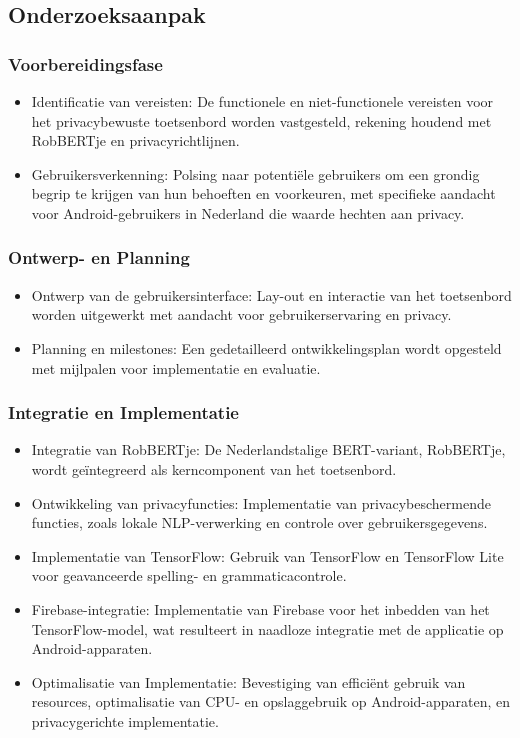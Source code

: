 \subsection{Onderzoeksaanpak}

\subsubsection{Voorbereidingsfase}
\begin{itemize}
    \item Identificatie van vereisten: De functionele en niet-functionele vereisten voor het privacybewuste toetsenbord worden vastgesteld, rekening houdend met RobBERTje en privacyrichtlijnen.
    \item Gebruikersverkenning: Polsing naar potentiële gebruikers om een grondig begrip te krijgen van hun behoeften en voorkeuren, met specifieke aandacht voor Android-gebruikers in Nederland die waarde hechten aan privacy.
\end{itemize}

\subsubsection{Ontwerp- en Planning}
\begin{itemize}
    \item Ontwerp van de gebruikersinterface: Lay-out en interactie van het toetsenbord worden uitgewerkt met aandacht voor gebruikerservaring en privacy.
    \item Planning en milestones: Een gedetailleerd ontwikkelingsplan wordt opgesteld met mijlpalen voor implementatie en evaluatie.
\end{itemize}

\subsubsection{Integratie en Implementatie}
\begin{itemize}
    \item Integratie van RobBERTje: De Nederlandstalige BERT-variant, RobBERTje, wordt geïntegreerd als kerncomponent van het toetsenbord.
    \item Ontwikkeling van privacyfuncties: Implementatie van privacybeschermende functies, zoals lokale NLP-verwerking en controle over gebruikersgegevens.
    \item Implementatie van TensorFlow: Gebruik van TensorFlow en TensorFlow Lite voor geavanceerde spelling- en grammaticacontrole.
    \item Firebase-integratie: Implementatie van Firebase voor het inbedden van het TensorFlow-model, wat resulteert in naadloze integratie met de applicatie op Android-apparaten.
    \item Optimalisatie van Implementatie: Bevestiging van efficiënt gebruik van resources, optimalisatie van CPU- en opslaggebruik op Android-apparaten, en privacygerichte implementatie.
\end{itemize}

